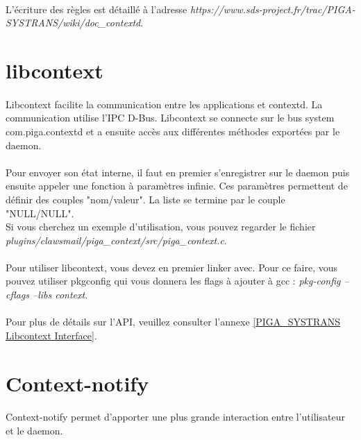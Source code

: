    		\paragraph*{}
   			L'écriture des règles est détaillé à l'adresse \emph{https://www.sds-project.fr/trac/PIGA-SYSTRANS/wiki/doc\_contextd}.
   					
	\section{libcontext}
		\paragraph*{}
			Libcontext facilite la communication entre les applications et contextd. La communication utilise l'IPC D-Bus. Libcontext se connecte sur le bus system com.piga.contextd et a ensuite accès aux différentes méthodes exportées par le daemon.
			
		\paragraph*{}
			Pour envoyer son état interne, il faut en premier s'enregistrer sur le daemon puis ensuite appeler une fonction à paramètres infinie. Ces paramètres permettent de définir des couples "nom/valeur". La liste se termine par le couple "NULL/NULL".\\
			Si vous cherchez un exemple d'utilisation, vous pouvez regarder le fichier \emph{plugins/claws\-mail/piga\_context/src/piga\_context.c}.
			
		\paragraph*{}
			Pour utiliser libcontext, vous devez en premier linker avec. Pour ce faire, vous pouvez utiliser pkgconfig qui vous donnera les flags à ajouter à gcc : \emph{pkg-config --cflags --libs context}.
			
		\paragraph*{}
			Pour plus de détails sur l'API, veuillez consulter l'annexe \ref{PIGA_SYSTRANS Libcontext Interface}.
		
	\section{Context-notify}
		\paragraph*{}
			Context-notify permet d'apporter une plus grande interaction entre l'utilisateur et le daemon.
			
